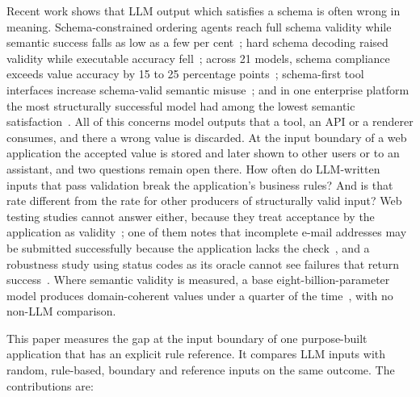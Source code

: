 \documentclass[conference]{IEEEtran}
\begin{document}
Recent work shows that LLM output which satisfies a schema is often wrong in meaning. Schema-constrained
ordering agents reach full schema validity while semantic success falls as low as a few per
cent~\cite{li2026orderbench}; hard schema decoding raised validity while executable accuracy
fell~\cite{ray2026constrainttax}; across 21 models, schema compliance exceeds value accuracy by 15 to 25
percentage points~\cite{singh2026sob}; schema-first tool interfaces increase schema-valid semantic
misuse~\cite{sigdel2026schemafirst}; and in one enterprise platform the most structurally successful
model had among the lowest semantic satisfaction~\cite{wrenn2026enterprise}. All of this concerns model
outputs that a tool, an API or a renderer consumes, and there a wrong value is discarded. At the input
boundary of a web application the accepted value is stored and later shown to other users or to an
assistant, and two questions remain open there. How often do LLM-written inputs that pass validation
break the application's business rules? And is that rate different from the rate for other producers of
structurally valid input? Web testing studies cannot answer either, because they treat acceptance by the
application as validity~\cite{li2026webformtest,alian2024formnexus}; one of them notes that incomplete
e-mail addresses may be submitted successfully because the application lacks the
check~\cite{li2026webformtest}, and a robustness study using status codes as its oracle cannot see
failures that return success~\cite{tigulla2026robustness}. Where semantic validity is measured, a base
eight-billion-parameter model produces domain-coherent values under a quarter of the
time~\cite{kim2025llamaresttest}, with no non-LLM comparison.

This paper measures the gap at the input boundary of one purpose-built application that has an explicit
rule reference. It compares LLM inputs with random, rule-based, boundary and reference inputs on the
same outcome. The contributions are:
\end{document}
